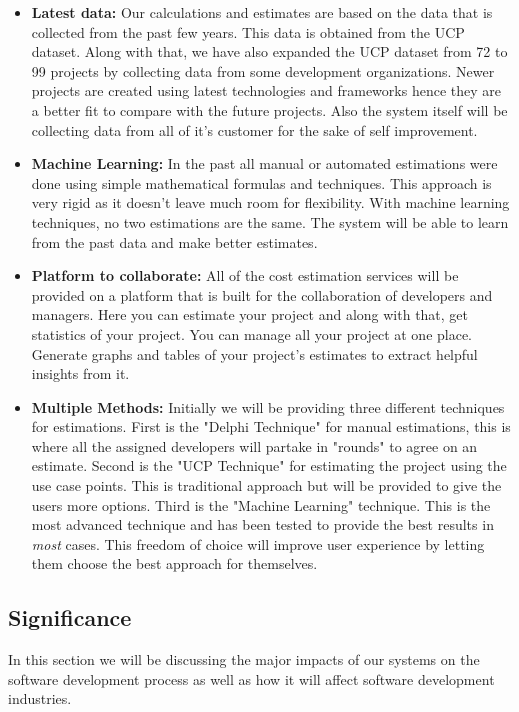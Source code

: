 \begin{itemize}
	\item {\bfseries Latest data:} Our calculations and estimates are based on the data that is collected from the past few years. This data is obtained from the UCP dataset. Along with that, we have also expanded the UCP dataset from 72 to 99 projects by collecting data from some development organizations. Newer projects are created using latest technologies and frameworks hence they are a better fit to compare with the future projects. Also the system itself will be collecting data from all of it's customer for the sake of self improvement.
	
	
	\item {\bfseries Machine Learning:} In the past all manual or automated estimations were done using simple mathematical formulas and techniques. This approach is very rigid as it doesn't leave much room for flexibility. With machine learning techniques, no two estimations are the same. The system will be able to learn from the past data and make better estimates.
	

	\item {\bfseries Platform to collaborate:} All of the cost estimation services will be provided on a platform that is built for the collaboration of developers and managers. Here you can estimate your project and along with that, get statistics of your project. You can manage all your project at one place. Generate graphs and tables of your project's estimates to extract helpful insights from it.
	

	\item {\bfseries Multiple Methods:} Initially we will be providing three different techniques for estimations. First is the "Delphi Technique" for manual estimations, this is where all the assigned developers will partake in "rounds" to agree on an estimate. Second is the "UCP Technique" for estimating the project using the use case points. This is traditional approach but will be provided to give the users more options. Third is the "Machine Learning" technique. This is the most advanced technique and has been tested to provide the best results in {\it{most}} cases. This freedom of choice will improve user experience by letting them choose the best approach for themselves.
\end{itemize}


\subsection{Significance}
In this section we will be discussing the major impacts of our systems on the software development process as well as how it will affect software development industries.
\vspace{2mm}

